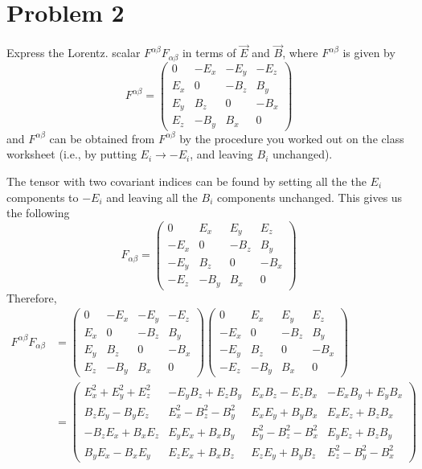 \documentclass[11pt]{article}
\begin{document}
\section*{Problem 2}

Express the Lorentz. scalar $F^{\alpha \beta}F_{\alpha \beta}$ in terms of $\vec{E}$ and $\vec{B}$, where $F^{\alpha \beta}$ is given by
$$
F^{\alpha \beta} = 
\begin{pmatrix}
    0 & -E_{x} & -E_{y} & -E_{z} \\
    E_{x} & 0 & -B_{z} & B_{y} \\
    E_{y} & B_{z} & 0 & -B_{x} \\
    E_{z} & -B_{y} & B_{x} & 0
\end{pmatrix}
$$
and $F^{\alpha \beta}$ can be obtained from $F^{\alpha \beta}$ by the procedure you worked out on the class worksheet (i.e., by putting $E_{i} \rightarrow - E_{i}$, and leaving $B_{i}$ unchanged).

The tensor with two covariant indices can be found by setting all the the $E_{i}$ components to $-E_{i}$ and leaving all the $B_{i}$ components unchanged. This gives us the following
$$
F_{\alpha \beta} = 
\begin{pmatrix}
    0 & E_{x} & E_{y} & E_{z} \\
    -E_{x} & 0 & -B_{z} & B_{y} \\
    -E_{y} & B_{z} & 0 & -B_{x} \\
    -E_{z} & -B_{y} & B_{x} & 0
\end{pmatrix}
$$
Therefore, 
\begin{align*}
F^{\alpha \beta} F_{\alpha \beta} &= 
 \begin{pmatrix}
    0 & -E_{x} & -E_{y} & -E_{z} \\
    E_{x} & 0 & -B_{z} & B_{y} \\
    E_{y} & B_{z} & 0 & -B_{x} \\
    E_{z} & -B_{y} & B_{x} & 0
\end{pmatrix}
\begin{pmatrix}
    0 & E_{x} & E_{y} & E_{z} \\
    -E_{x} & 0 & -B_{z} & B_{y} \\
    -E_{y} & B_{z} & 0 & -B_{x} \\
    -E_{z} & -B_{y} & B_{x} & 0
\end{pmatrix} \\
&=\left(\begin{array}{cccc}
E_{x}^{2}+E_{y}^{2}+E_{z}^{2} & -E_{y} B_{z}+E_{z} B_{y} & E_{x} B_{z}-E_{z} B_{x} & -E_{x} B_{y}+E_{y} B_{x} \\
B_{z} E_{y}-B_{y} E_{z} & E_{x}^{2}-B_{z}^{2}-B_{y}^{2} & E_{x} E_{y}+B_{y} B_{x} & E_{x} E_{z}+B_{z} B_{x} \\
-B_{z} E_{x}+B_{x} E_{z} & E_{y} E_{x}+B_{x} B_{y} & E_{y}^{2}-B_{z}^{2}-B_{x}^{2} & E_{y} E_{z}+B_{z} B_{y} \\
B_{y} E_{x}-B_{x} E_{y} & E_{z} E_{x}+B_{x} B_{z} & E_{z} E_{y}+B_{y} B_{z} & E_{z}^{2}-B_{y}^{2}-B_{x}^{2}
\end{array}\right)
\end{align*}
\end{document}
